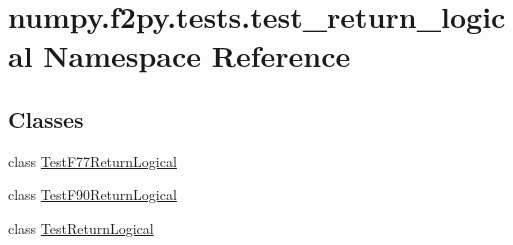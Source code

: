 \hypertarget{namespacenumpy_1_1f2py_1_1tests_1_1test__return__logical}{}\section{numpy.\+f2py.\+tests.\+test\+\_\+return\+\_\+logical Namespace Reference}
\label{namespacenumpy_1_1f2py_1_1tests_1_1test__return__logical}
\subsection*{Classes}
\begin{DoxyCompactItemize}
\item 
class \hyperlink{classnumpy_1_1f2py_1_1tests_1_1test__return__logical_1_1TestF77ReturnLogical}{Test\+F77\+Return\+Logical}
\item 
class \hyperlink{classnumpy_1_1f2py_1_1tests_1_1test__return__logical_1_1TestF90ReturnLogical}{Test\+F90\+Return\+Logical}
\item 
class \hyperlink{classnumpy_1_1f2py_1_1tests_1_1test__return__logical_1_1TestReturnLogical}{Test\+Return\+Logical}
\end{DoxyCompactItemize}
